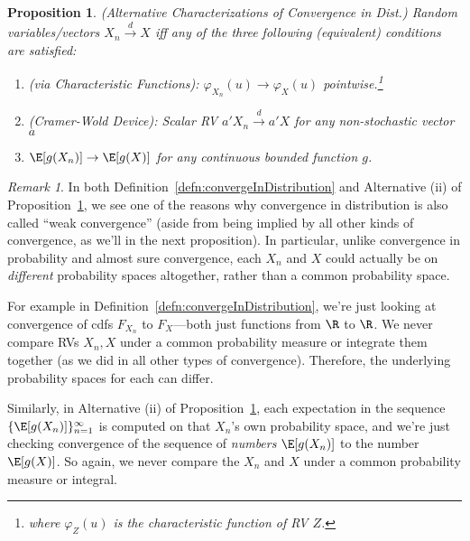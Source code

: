 \documentclass[12pt]{article}
\theoremstyle{plain}
\newtheorem{prop}[thm]{Proposition}
\theoremstyle{definition}
\theoremstyle{remark}
\newtheorem*{rmk}{Remark}
\newcommand{\ra}{\rightarrow}
\newcommand{\dto}{\xrightarrow{d}}
\newcommand{\ninf}{_{n=1}^\infty}
\begin{document}
\begin{prop}
\label{prop:altdto}
\emph{(Alternative Characterizations of Convergence in Dist.)}
Random variables/vectors $X_n \dto X$ iff any of the three following
(equivalent) conditions are satisfied:
\begin{enumerate}[label=\emph{(\roman*)}]
  \item
    \emph{(via Characteristic Functions):}
    $\varphi_{X_n}(u)\ra \varphi_X(u)$ pointwise.\footnote{%
      where $\varphi_Z(u)$ is the characteristic function of RV $Z$.
    }

  \item \emph{(Cramer-Wold Device):}
    Scalar RV $a'X_n \dto a'X$ for \emph{any} non-stochastic vector $a$

  \item
    $\E[g(X_n)]\ra\E[g(X)]$ for \emph{any} continuous bounded function
    $g$.
\end{enumerate}
\end{prop}
\begin{rmk}
In both Definition~\ref{defn:convergeInDistribution} and Alternative
(ii) of Proposition~\ref{prop:altdto}, we see one of the reasons why
convergence in distribution is also called ``weak convergence'' (aside
from being implied by all other kinds of convergence, as we'll in the
next proposition). In particular, unlike convergence in probability and
almost sure convergence, each $X_n$ and $X$ could actually be on
\emph{different} probability spaces altogether, rather than a common
probability space.

For example in Definition~\ref{defn:convergeInDistribution}, we're just
looking at convergence of cdfs $F_{X_n}$ to $F_X$---both just functions
from $\R$ to $\R$.  We never compare RVs $X_n,X$ under a common
probability measure or integrate them together (as we did in all other
types of convergence). Therefore, the underlying probability spaces for
each can differ.

Similarly, in Alternative (ii) of Proposition~\ref{prop:altdto}, each
expectation in the sequence $\{\E[g(X_n)]\}\ninf$ is computed on that
$X_n$'s own probability space, and we're just checking convergence of
the sequence of \emph{numbers} $\E[g(X_n)]$ to the number $\E[g(X)]$.
So again, we never compare the $X_n$ and $X$ under a common probability
measure or integral.
\end{rmk}
\end{document}
